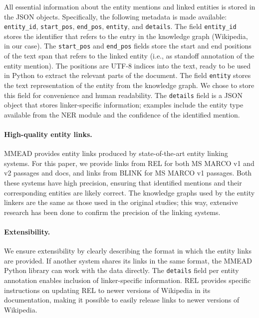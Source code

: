 All essential information about the entity mentions and linked entities is stored in the JSON objects. 
Specifically, the following metadata is made available: \texttt{entity\_id}, \texttt{start\_pos}, \texttt{end\_pos}, \texttt{entity}, and \texttt{details}. The field \texttt{entity\_id} stores the identifier that refers to the entry in the knowledge graph (Wikipedia, in our case). The \texttt{start\_pos} and \texttt{end\_pos} fields store the start and end positions of the text span that refers to the linked entity (i.e., as standoff annotation of the entity mention). The positions are UTF-8 indices into the text, ready to be used in Python to extract the relevant parts of the document. The field \texttt{entity} stores the text representation of the entity from the knowledge graph. 
We chose to store this field for convenience and human readability. The \texttt{details} field is a JSON object that stores linker-specific information; examples include the entity type available from the NER module and the confidence of the identified mention.

\paragraph{High-quality entity links.} MMEAD provides entity links produced by state-of-the-art entity linking systems. For this paper, we provide links from REL for both MS MARCO v1 and v2 passages and docs, and links from BLINK for MS MARCO v1 passages. Both these systems have high precision, ensuring that identified mentions and their corresponding entities are likely correct. The knowledge graphs used by the entity linkers are the same as those used in the original studies; this way, extensive research has been done to confirm the precision of the linking systems.

\paragraph{Extensibility.} We ensure extensibility by clearly describing the format in which the entity links are provided. If another system shares its links in the same format, the MMEAD Python library can work with the data directly. The \texttt{details} field per entity annotation enables inclusion of linker-specific information. REL provides specific instructions on updating REL to newer versions of Wikipedia in its documentation, making it possible to easily release links to newer versions of Wikipedia.

